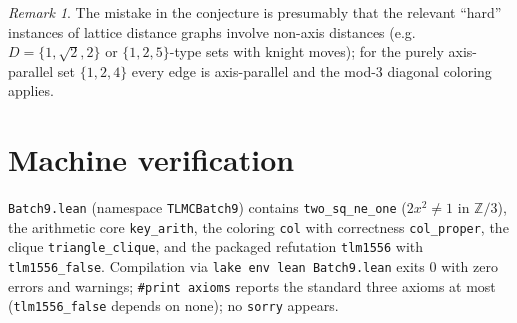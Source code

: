 \documentclass[11pt]{article}
\theoremstyle{definition}
\theoremstyle{remark}
\newtheorem*{remark}{Remark}
\begin{document}
\begin{remark}
The mistake in the conjecture is presumably that the relevant ``hard'' instances of lattice distance graphs involve non-axis distances (e.g.\ $D = \{1, \sqrt{2}, 2\}$ or $\{1, 2, 5\}$-type sets with knight moves); for the purely axis-parallel set $\{1,2,4\}$ every edge is axis-parallel and the mod-$3$ diagonal coloring applies.
\end{remark}

\section{Machine verification}

\texttt{Batch9.lean} (namespace \texttt{TLMCBatch9}) contains \texttt{two\_sq\_ne\_one} ($2x^2 \ne 1$ in $\mathbb{Z}/3$), the arithmetic core \texttt{key\_arith}, the coloring \texttt{col} with correctness \texttt{col\_proper}, the clique \texttt{triangle\_clique}, and the packaged refutation \texttt{tlm1556} with \texttt{tlm1556\_false}. Compilation via \texttt{lake env lean Batch9.lean} exits $0$ with zero errors and warnings; \texttt{\#print axioms} reports the standard three axioms at most (\texttt{tlm1556\_false} depends on none); no \texttt{sorry} appears.
\end{document}
